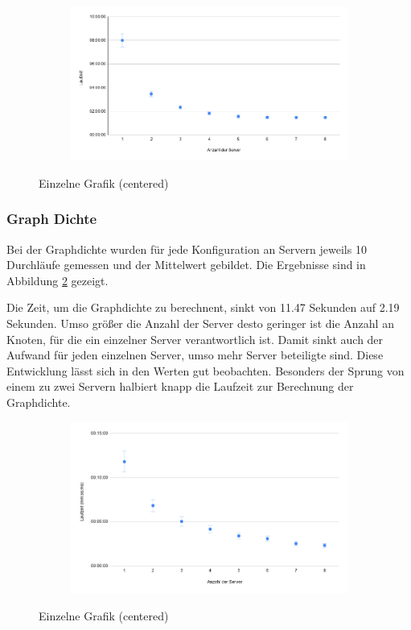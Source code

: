 \begin{figure}
  \centering
  \begin{subfigure}[b]{1.0\textwidth}
    \includegraphics[width=1.0\linewidth]{img/eval_load.png}
  \end{subfigure}
  \caption{Einzelne Grafik (centered)}
  \label{eval:load}
\end{figure}

\subsubsection{Graph Dichte}

Bei der Graphdichte wurden für jede Konfiguration an Servern jeweils 10 Durchläufe gemessen und der Mittelwert gebildet. Die Ergebnisse sind in Abbildung \ref{eval:density} gezeigt.

Die Zeit, um die Graphdichte zu berechnent, sinkt von 11.47 Sekunden auf 2.19 Sekunden. Umso größer die Anzahl der Server desto geringer ist die Anzahl an Knoten, für die ein einzelner Server verantwortlich ist. Damit sinkt auch der Aufwand für jeden einzelnen Server, umso mehr Server beteiligte sind. 
Diese Entwicklung lässt sich in den Werten gut beobachten. Besonders der Sprung von einem zu zwei Servern halbiert knapp die Laufzeit zur Berechnung der Graphdichte.

\begin{figure}
  \centering
  \begin{subfigure}[b]{1.0\textwidth}
    \includegraphics[width=1.0\linewidth]{img/eval_density.png}
  \end{subfigure}
  \caption{Einzelne Grafik (centered)}
  \label{eval:density}
\end{figure}



